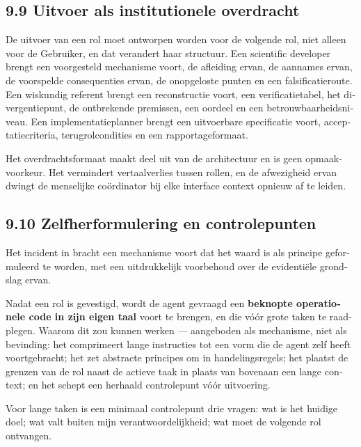 \begin{dutch}
\subsection*{9.9 Uitvoer als institutionele overdracht}
\label{sec:nl:9.9}

De uitvoer van een rol moet ontworpen worden voor de volgende rol, niet alleen voor de Gebruiker, en dat verandert haar structuur. Een scientific developer brengt een voorgesteld mechanisme voort, de afleiding ervan, de aannames ervan, de voorspelde consequenties ervan, de onopgeloste punten en een falsificatieroute. Een wiskundig referent brengt een reconstructie voort, een verificatietabel, het divergentiepunt, de ontbrekende premissen, een oordeel en een betrouwbaarheidsniveau. Een implementatieplanner brengt een uitvoerbare specificatie voort, acceptatiecriteria, terugrolcondities en een rapportageformaat.

Het overdrachtsformaat maakt deel uit van de architectuur en is geen opmaakvoorkeur. Het vermindert vertaalverlies tussen rollen, en de afwezigheid ervan dwingt de menselijke coördinator bij elke interface context opnieuw af te leiden.


\subsection*{9.10 Zelfherformulering en controlepunten}
\label{sec:nl:9.10}

Het incident in  bracht een mechanisme voort dat het waard is als principe geformuleerd te worden, met een uitdrukkelijk voorbehoud over de evidentiële grondslag ervan.

Nadat een rol is gevestigd, wordt de agent gevraagd een \textbf{beknopte operationele code in zijn eigen taal} voort te brengen, en die vóór grote taken te raadplegen. Waarom dit zou kunnen werken — aangeboden als mechanisme, niet als bevinding: het comprimeert lange instructies tot een vorm die de agent zelf heeft voortgebracht; het zet abstracte principes om in handelingsregels; het plaatst de grenzen van de rol naast de actieve taak in plaats van bovenaan een lange context; en het schept een herhaald controlepunt vóór uitvoering.

Voor lange taken is een minimaal controlepunt drie vragen: wat is het huidige doel; wat valt buiten mijn verantwoordelijkheid; wat moet de volgende rol ontvangen.


\end{dutch}
